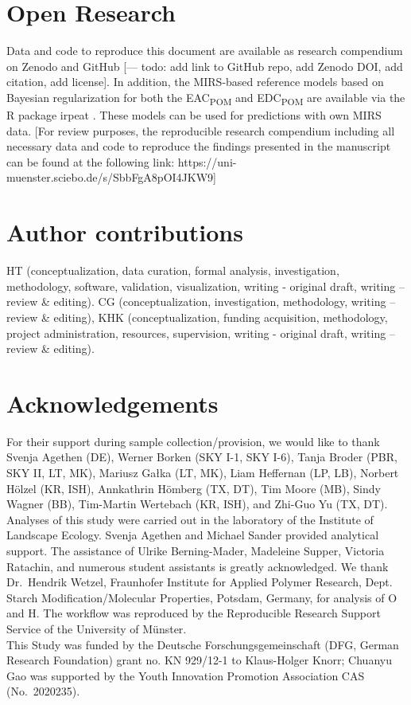 \documentclass[draft,linenumbers]{agujournal2018}
\begin{document}
\section*{Open Research}

Data and code to reproduce this document are available as research
compendium on Zenodo and GitHub {[}--- todo: add link to GitHub repo,
add Zenodo DOI, add citation, add license{]}. In addition, the
MIRS-based reference models based on Bayesian regularization for both
the EAC\textsubscript{POM} and EDC\textsubscript{POM} are available via
the R package irpeat \citep{Teickner.2020b}. These models can be used
for predictions with own MIRS data. {[}For review purposes, the
reproducible research compendium including all necessary data and code
to reproduce the findings presented in the manuscript can be found at
the following link: https://uni-muenster.sciebo.de/s/SbbFgA8pOI4JKW9{]}

\section*{Author contributions}

HT (conceptualization, data curation, formal analysis, investigation,
methodology, software, validation, visualization, writing - original
draft, writing -- review \& editing). CG (conceptualization,
investigation, methodology, writing -- review \& editing), KHK
(conceptualization, funding acquisition, methodology, project
administration, resources, supervision, writing - original draft,
writing -- review \& editing).

\section*{Acknowledgements}

For their support during sample collection/provision, we would like to
thank Svenja Agethen (DE), Werner Borken (SKY I-1, SKY I-6), Tanja
Broder (PBR, SKY II, LT, MK), Mariusz Gałka (LT, MK), Liam Heffernan
(LP, LB), Norbert Hölzel (KR, ISH), Annkathrin Hömberg (TX, DT), Tim
Moore (MB), Sindy Wagner (BB), Tim-Martin Wertebach (KR, ISH), and
Zhi-Guo Yu (TX, DT).\\
Analyses of this study were carried out in the laboratory of the
Institute of Landscape Ecology. Svenja Agethen and Michael Sander
provided analytical support. The assistance of Ulrike Berning-Mader,
Madeleine Supper, Victoria Ratachin, and numerous student assistants is
greatly acknowledged. We thank Dr.~Hendrik Wetzel, Fraunhofer Institute
for Applied Polymer Research, Dept. Starch Modification/Molecular
Properties, Potsdam, Germany, for analysis of O and H. The workflow was
reproduced by the Reproducible Research Support Service of the
University of Münster.\\
This Study was funded by the Deutsche Forschungsgemeinschaft (DFG,
German Research Foundation) grant no. KN 929/12-1 to Klaus-Holger Knorr;
Chuanyu Gao was supported by the Youth Innovation Promotion Association
CAS (No.~2020235).
\end{document}
